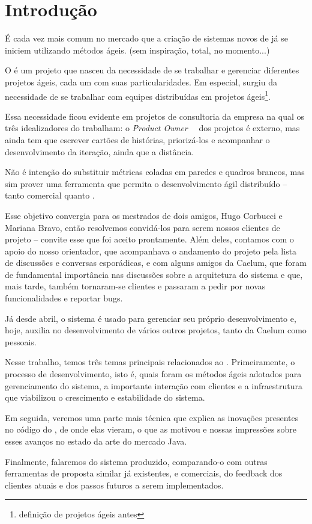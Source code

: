 \section{Introdução}
É cada vez mais comum no mercado que a criação de sistemas novos de \software já se iniciem utilizando métodos ágeis. (sem inspiração, total, no momento...)

O \calopsita{} é um projeto que nasceu da necessidade de se trabalhar e gerenciar diferentes projetos ágeis, cada um com suas particularidades. Em especial, surgiu da necessidade de se trabalhar com equipes distribuídas em projetos ágeis\footnote{definição de projetos ágeis antes}. 

Essa necessidade ficou evidente em projetos de consultoria da empresa na qual os três idealizadores do \calopsita{} trabalham: o \textit{Product Owner}~\cite{po}~\cite{scrum}
dos projetos é externo, mas ainda tem que escrever cartões de histórias, priorizá-los e acompanhar o desenvolvimento da iteração, ainda que a distância.

Não é intenção do \calopsita{} substituir métricas coladas em paredes e quadros brancos, mas sim prover uma ferramenta que permita o desenvolvimento ágil distribuído -- tanto comercial quanto \opensource{}.  

Esse objetivo convergia para os mestrados de dois amigos, Hugo Corbucci e Mariana Bravo, então resolvemos convidá-los para serem nossos clientes de projeto -- convite esse que foi aceito prontamente. Além deles, contamos com o apoio do nosso orientador, que acompanhava o andamento do projeto pela lista de discussões e conversas esporádicas, e com alguns amigos da Caelum, que foram de fundamental importância nas discussões sobre a arquitetura do sistema e que, mais tarde, também tornaram-se clientes e passaram a pedir por novas funcionalidades e reportar bugs. 

Já desde abril, o sistema é usado para gerenciar seu próprio desenvolvimento e, hoje, auxilia no desenvolvimento de vários outros projetos, tanto da Caelum como pessoais.

Nesse trabalho, temos três temas principais relacionados ao \calopsita{}. Primeiramente, o processo de desenvolvimento, isto é, quais foram os métodos ágeis adotados para gerenciamento do sistema, a importante interação com clientes e a infraestrutura que viabilizou o crescimento e estabilidade do sistema. 

Em seguida, veremos uma parte mais técnica que explica as inovações presentes no código do \calopsita{}, de onde elas vieram, o que as motivou e nossas impressões sobre esses avanços no estado da arte do mercado Java.

Finalmente, falaremos do sistema produzido, comparando-o com outras ferramentas de proposta similar já existentes, \opensource{} e comerciais, do feedback dos clientes atuais e dos passos futuros a serem implementados.
